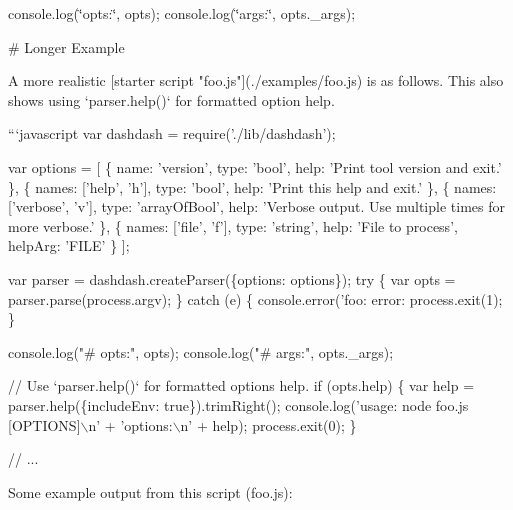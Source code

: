 console.\+log(\char`\"{}opts\+:\char`\"{}, opts); console.\+log(\char`\"{}args\+:\char`\"{}, opts.\+\_\+args); 
\begin{DoxyCode}
# Longer Example

A more realistic [starter script "foo.js"](./examples/foo.js) is as follows.
This also shows using `parser.help()` for formatted option help.

```javascript
var dashdash = require('./lib/dashdash');

var options = [
    \{
        name: 'version',
        type: 'bool',
        help: 'Print tool version and exit.'
    \},
    \{
        names: ['help', 'h'],
        type: 'bool',
        help: 'Print this help and exit.'
    \},
    \{
        names: ['verbose', 'v'],
        type: 'arrayOfBool',
        help: 'Verbose output. Use multiple times for more verbose.'
    \},
    \{
        names: ['file', 'f'],
        type: 'string',
        help: 'File to process',
        helpArg: 'FILE'
    \}
];

var parser = dashdash.createParser(\{options: options\});
try \{
    var opts = parser.parse(process.argv);
\} catch (e) \{
    console.error('foo: error: %
    process.exit(1);
\}

console.log("# opts:", opts);
console.log("# args:", opts.\_args);

// Use `parser.help()` for formatted options help.
if (opts.help) \{
    var help = parser.help(\{includeEnv: true\}).trimRight();
    console.log('usage: node foo.js [OPTIONS]\(\backslash\)n'
                + 'options:\(\backslash\)n'
                + help);
    process.exit(0);
\}

// ...
\end{DoxyCode}


Some example output from this script (foo.\+js)\+:



